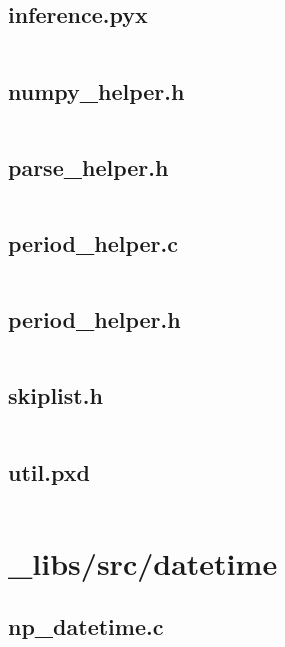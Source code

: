 \documentclass{article}
\begin{document}
\subsection{inference.pyx}
\inputminted{cython}{/home/dufferzafar/dev/@clones/pandas/pandas/_libs/src/inference.pyx}
\newpage

\subsection{numpy\_helper.h}
\inputminted{c}{/home/dufferzafar/dev/@clones/pandas/pandas/_libs/src/numpy_helper.h}
\newpage

\subsection{parse\_helper.h}
\inputminted{c}{/home/dufferzafar/dev/@clones/pandas/pandas/_libs/src/parse_helper.h}
\newpage

\subsection{period\_helper.c}
\inputminted{c}{/home/dufferzafar/dev/@clones/pandas/pandas/_libs/src/period_helper.c}
\newpage

\subsection{period\_helper.h}
\inputminted{c}{/home/dufferzafar/dev/@clones/pandas/pandas/_libs/src/period_helper.h}
\newpage

\subsection{skiplist.h}
\inputminted{c}{/home/dufferzafar/dev/@clones/pandas/pandas/_libs/src/skiplist.h}
\newpage

\subsection{util.pxd}
\inputminted{cython}{/home/dufferzafar/dev/@clones/pandas/pandas/_libs/src/util.pxd}
\newpage

\section{\_libs/src/datetime}

\subsection{np\_datetime.c}
\inputminted{c}{/home/dufferzafar/dev/@clones/pandas/pandas/_libs/src/datetime/np_datetime.c}
\newpage
\end{document}
